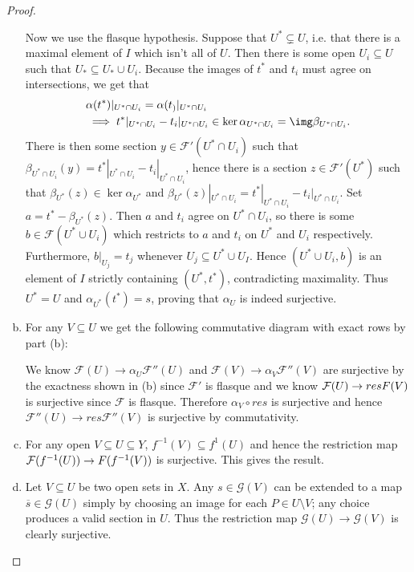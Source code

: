 \begin{problemset}
\begin{proof}
\begin{enumerate}[(a)]
				\medskip

				Now we use the flasque hypothesis. Suppose that $U^* \subsetneq U$, i.e. that there is a maximal element of $I$ which isn't all of $U$. Then there is some open $U_i\subseteq U$ such that $U_*\subseteq U_*\cup U_i$. Because the images of $t^*$ and $t_i$ must agree on intersections, we get that
				\begin{align*}
					&\alpha(t^*)|_{U^*\cap U_i} = \alpha(t_)|_{U^*\cap U_i} \\
					&\implies t^*|_{U^*\cap U_i} - t_i|_{U^*\cap U_i} \in \ker\alpha_{U^*\cap U_i} = \img\beta_{U^*\cap U_i}.
				\end{align*}
				There is then some section $y \in \mathcal F'(U^*\cap U_i)$ such that $\beta_{U^*\cap U_i}(y) = t^*|_{U^*\cap U_i} - t_i|_{U^*\cap U_i}$, hence there is a section $z \in \mathcal F'(U^*)$ such that $\beta_{U^*}(z) \in \ker\alpha_{U^*}$ and $\beta_{U^*}(z)|_{U^*\cap U_i} = t^*|_{U^*\cap U_i} - t_i|_{U^*\cap U_i}$. Set $a = t^* - \beta_{U^*}(z)$. Then $a$ and $t_i$ agree on $U^*\cap U_i$, so there is some $b\in \mathcal F(U^*\cup U_i)$ which restricts to $a$ and $t_i$ on $U^*$ and $U_i$ respectively. Furthermore, $b|_{U_j} = t_j$ whenever $U_j \subseteq U^*\cup U_I$. Hence $(U^*\cup U_i, b)$ is an element of $I$ strictly containing $(U^*,t^*)$, contradicting maximality. Thus $U^* = U$ and $\alpha_{U^*}(t^*) = s$, proving that $\alpha_U$ is indeed surjective.
			\item For any $V\subseteq U$ we get the following commutative diagram with exact rows by part (b):
				\begin{center}
				\end{center}
				We know $\mathcal F(U) \to{\alpha_U}\mathcal F''(U)$ and $\mathcal F(V) \to{\alpha_V}\mathcal F''(V)$ are surjective by the exactness shown in (b) since $\mathcal F'$ is flasque and we know $\mathcal F(U)\to{res}\mathcal \mathcal F(V)$ is surjective since $\mathcal F$ is flasque. Therefore $\alpha_V\circ res$ is surjective and hence $\mathcal F''(U)\to{res}\mathcal F''(V)$ is surjective by commutativity.
			\item For any open $V\subseteq U \subseteq Y$, $f^{-1}(V) \subseteq f^{1}(U)$ and hence the restriction map $\mathcal F(f^{-1}(U))\to \mathcal \mathcal F(f^{-1}(V))$ is surjective. This gives the result.
			\item Let $V\subseteq U$ be two open sets in $X$. Any $s\in \mathcal G(V)$ can be extended to a map $\overline s\in \mathcal G(U)$ simply by choosing an image for each $P\in U\setminus V$; any choice produces a valid section in $U$. Thus the restriction map $\mathcal G(U)\to \mathcal G(V)$ is clearly surjective.


\end{enumerate}
\end{proof}
\end{problemset}
